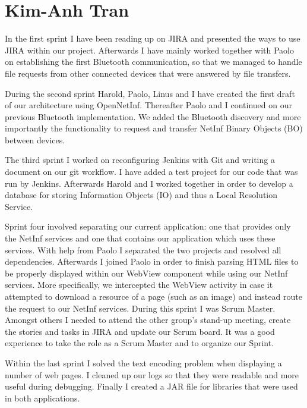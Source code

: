 \section{Kim-Anh Tran}
In the first sprint I have been reading up on JIRA and presented the ways to use
JIRA within our project. Afterwards I have mainly worked together with Paolo on establishing
the first Bluetooth communication, so that we managed to handle file requests from other connected
devices that were answered by file transfers.

During the second sprint Harold, Paolo, Linus and I have created the first draft of our architecture using OpenNetInf. Thereafter Paolo and I continued on our previous Bluetooth implementation. We added
the Bluetooth discovery and more importantly the functionality to request and
transfer NetInf Binary Objects (BO) between devices.

The third sprint I worked on reconfiguring Jenkins with Git and writing a document on
our git workflow. I have added a test project for our code that was run by Jenkins.
Afterwards Harold and I worked together in order to develop a database for storing
Information Objects (IO) and thus a Local Resolution Service.

Sprint four involved separating our current application: one that provides
only the NetInf services and one that contains our application which uses
these services. With help from Paolo I separated the two projects and resolved
all dependencies. Afterwards I joined Paolo in order to finish parsing HTML files
to be properly displayed within our WebView component while using our NetInf services.
More specifically, we intercepted the WebView activity in case it attempted to
download a resource of a page (such as an image) and instead route the 
request to our NetInf services.
During this sprint I was Scrum Master. Amongst others I needed to attend the other group's
stand-up meeting, create the stories and tasks in JIRA and update our Scrum board.
It was a good experience to take the role as a Scrum Master and to organize our Sprint.

Within the last sprint I solved the text encoding problem when displaying 
a number of web pages. I cleaned up our logs so that they were readable and
more useful during debugging. Finally I created a JAR file for
libraries that were used in both applications.

